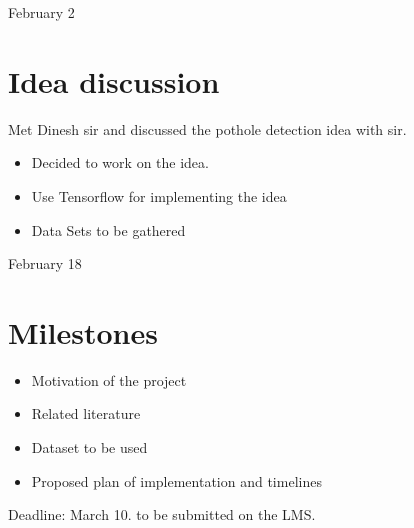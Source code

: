 \documentclass[11pt,letterpaper]{article}
\begin{document}
\univlogo



{\Huge February 2}\\[5mm]

\section*{Idea discussion}
Met Dinesh sir and discussed the pothole detection idea with sir.
\begin{itemize}
\item Decided to work on the idea.
\item Use Tensorflow for implementing the idea
\item Data Sets to be gathered
\end{itemize} 
{\Huge February 18}\\[5mm]

\section*{Milestones}

\begin{itemize}


\item Motivation of the project

\item Related literature

\item Dataset to be used

\item Proposed plan of implementation and timelines

\end{itemize}
Deadline: March 10. to be submitted on the LMS.
\end{document}
